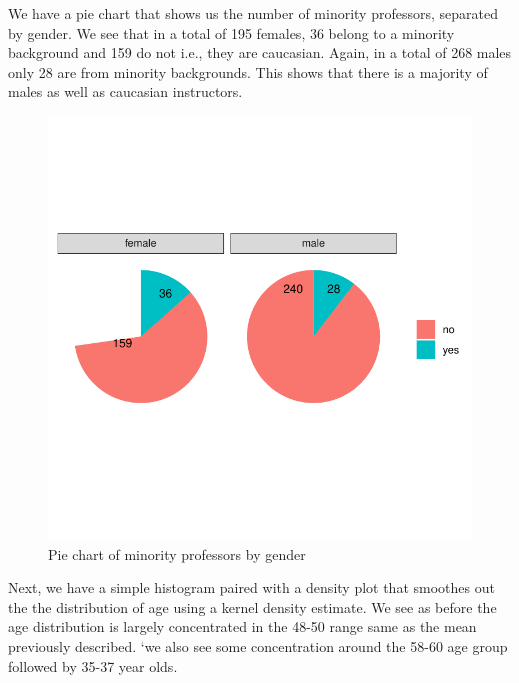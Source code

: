 \documentclass[
  12 pt,
]{article}
\begin{document}
We have a pie chart that shows us the number of minority professors, separated by gender. We see that in a total of 195 females, 36 belong to a minority background and 159 do not i.e., they are caucasian. Again, in a total of 268 males only 28 are from minority backgrounds. This shows that there is a majority of males as well as caucasian instructors.

\begin{figure}[H]

{\centering \includegraphics{18205420_Markdown--1-_files/figure-latex/piechart-1} 

}

\caption{Pie chart of minority professors by gender}\label{fig:piechart}
\end{figure}
\newpage

Next, we have a simple histogram paired with a density plot that smoothes out the the distribution of age using a kernel density estimate. We see as before the age distribution is largely concentrated in the 48-50 range same as the mean previously described. `we also see some concentration around the 58-60 age group followed by 35-37 year olds.
\end{document}
